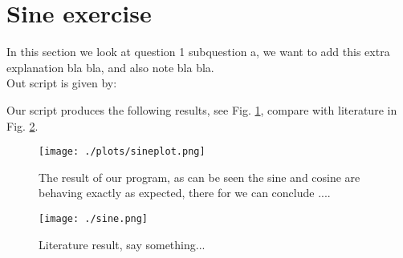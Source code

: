 \section{Sine exercise}

In this section we look at question 1 subquestion a, 
we want to add this extra explanation bla bla, and also 
note bla bla. \\

Out script is given by:


Our script produces the following results, see Fig. \ref{fig:fig1},
compare with literature in Fig. \ref{fig:fig2}.


\begin{figure}[h!]
  \centering
  \texttt{[image: ./plots/sineplot.png]}
  \caption{The result of our program, as can be seen the 
  sine and cosine are behaving exactly as expected, there 
  for we can conclude ....}
  \label{fig:fig1}
\end{figure}

\begin{figure}[h!]
  \centering
  \texttt{[image: ./sine.png]}
  \caption{Literature result, say something...}
  \label{fig:fig2}
\end{figure}
